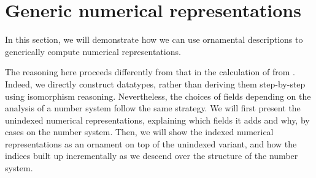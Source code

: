 \begin{comment}
Looking back at \AgdaDatatype{Vec}, ornaments let us show that express that \AgdaDatatype{Vec} can be formed by introducing indices and adding a fields holding an elements to \bN{}.
However, deriving \AgdaDatatype{List} from \bN{} generalizes to \bL{} with less notational overhead, so we tackle that case first. We use the following description of \bN{}
\ExecuteMetaData[Tex/NumRepOrn]{NatD}
Here, \AgdaInductiveConstructor{σ} adds a field to the description, upon which the rest of the description can vary, and \AgdaInductiveConstructor{ṿ} lists the recursive fields and their indices (which can only be \AgdaInductiveConstructor{tt}).
We can now write down the ornament which adds fields to the \AgdaFunction{suc} constructor
\ExecuteMetaData[Tex/NumRepOrn]{ListO}
Here, the \AgdaInductiveConstructor{σ} and \AgdaInductiveConstructor{ṿ} are forced to match those of \AgdaDatatype{NatD},
but the \AgdaInductiveConstructor{Δ} adds a new field. Using the least fixpoint and description extraction, we can then define \AgdaDatatype{List} from this ornamental description. Note that we cannot hope to give an unindexed ornament from \bL{}
\ExecuteMetaData[Tex/NumRepOrn]{LeibnizD}
into trees, since trees have a very different recursive structure! Thus, we must keep track at what level we are in the tree so that we can ask for adequately many elements:
\ExecuteMetaData[Tex/NumRepOrn]{TreeO}
We use the \AgdaFunction{power} combinator to ensure that the digit at position $n$, which has weight $2^n$ in the interpretation of a binary number, also holds its value times $2^n$ elements. This makes sure that the number of elements in the tree shaped after a given binary number also is the value of that  binary number.
\end{comment}


\section{Generic numerical representations}\label{sec:trieo}
In this section, we will demonstrate how we can use ornamental descriptions to generically compute numerical representations. 

The reasoning here proceeds differently from that in the calculation of  from \bN{}. Indeed, we directly construct datatypes, 
rather than deriving them step-by-step using isomorphism reasoning. Nevertheless, the choices of fields depending on the analysis of a number system follow the same strategy. We will first present the unindexed numerical representations, explaining which fields it adds and why, by cases on the number system. Then, we will show the indexed numerical representations as an ornament on top of the unindexed variant, and how the indices built up incrementally as we descend over the structure of the number system.

